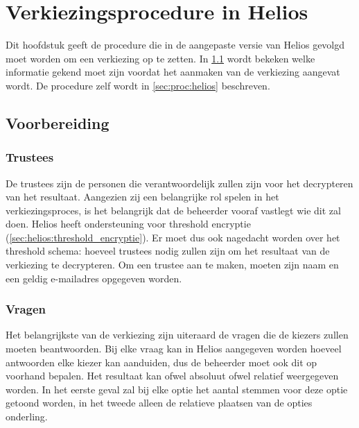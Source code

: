 % 
%

\chapter{Verkiezingsprocedure in Helios}
\label{chap:procedure}

Dit hoofdstuk geeft de procedure die in de aangepaste versie van Helios gevolgd moet worden om een verkiezing op te zetten. In \ref{sec:proc:voorbereiding} wordt bekeken welke informatie gekend moet zijn voordat het aanmaken van de verkiezing aangevat wordt. De procedure zelf wordt in \ref{sec:proc:helios} beschreven.

\section{Voorbereiding}
\label{sec:proc:voorbereiding}

\subsection{Trustees}

De trustees zijn de personen die verantwoordelijk zullen zijn voor het decrypteren van het resultaat. Aangezien zij een belangrijke rol spelen in het verkiezingsproces, is het belangrijk dat de beheerder vooraf vastlegt wie dit zal doen. Helios heeft ondersteuning voor threshold encryptie (\ref{sec:helios:threshold_encryptie}). Er moet dus ook nagedacht worden over het threshold schema: hoeveel trustees nodig zullen zijn om het resultaat van de verkiezing te decrypteren. Om een trustee aan te maken, moeten zijn naam en een geldig e-mailadres opgegeven worden.

\subsection{Vragen}
\label{sec:proc:voorbereiding:vragen}

Het belangrijkste van de verkiezing zijn uiteraard de vragen die de kiezers zullen moeten beantwoorden. Bij elke vraag kan in Helios aangegeven worden hoeveel antwoorden elke kiezer kan aanduiden, dus de beheerder moet ook dit op voorhand bepalen. Het resultaat kan ofwel absoluut ofwel relatief weergegeven worden. In het eerste geval zal bij elke optie het aantal stemmen voor deze optie getoond worden, in het tweede alleen de relatieve plaatsen van de opties onderling.

